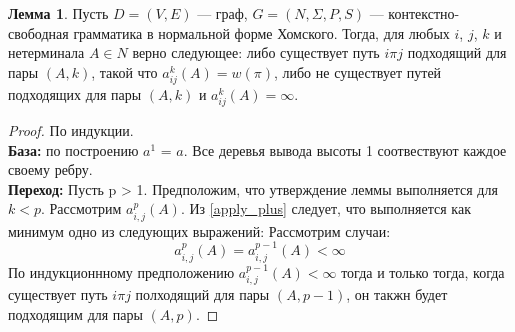 \documentclass[14pt]{matmex-diploma}
\theoremstyle{definition}
\newtheorem{lemma}{Лемма}
\begin{document}
       \begin{lemma}
       \label{eq_some}
           Пусть $D=(V,E)$ --- граф, $G=(N,\Sigma, P, S)$ --- контекстно-свободная грамматика в нормальной форме Хомского. Тогда, для любых $i$, $j$, $k$ и нетерминала $A\in N$
       верно следующее: либо существует путь $i\pi j$ подходящий для пары $(A, k)$, такой что $a^k_{ij}(A) = w(\pi)$, либо не существует путей подходящих для пары $(A, k)$ и $a^k_{ij}(A) = \infty$.
       \end{lemma}
       \begin{proof}
            По индукции.\\
            \textbf{База:} по построению $a^1$ = $a$. Все деревья вывода высоты 1 соотвествуют каждое своему ребру.\\
            \textbf{Переход:} Пусть p > 1. Предположим, что утверждение леммы выполняется для $k < p$. Рассмотрим $a^p_{i,j}(A)$. Из \eqref{apply_plus} следует, что выполняется как минимум одно из следующих выражений:
            Рассмотрим случаи:\\
        
            \begin{equation*}
               a^p_{i,j}(A) = a^{p-1}_{i,j}(A) < \infty
            \end{equation*}
            По индукционнному предположению $a^{p-1}_{i,j}(A) < \infty$ тогда и только тогда, когда существует путь $i\pi j$ полходящий для пары $(A, p-1)$, он такжн будет подходящим для пары $(A, p)$.
            

\end{proof}
\end{document}
